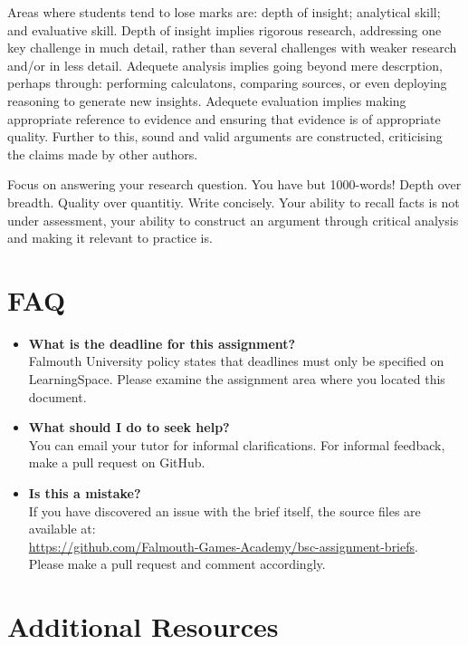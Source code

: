 \documentclass{../fal_assignment}
\begin{document}
Areas where students tend to lose marks are: depth of insight; analytical skill; and evaluative skill. Depth of insight implies rigorous research, addressing one key challenge in much detail, rather than several challenges with weaker research and/or in less detail. Adequete analysis implies going beyond mere descrption, perhaps through: performing calculatons, comparing sources, or even deploying reasoning to generate new insights. Adequete evaluation implies making appropriate reference to evidence and ensuring that evidence is of appropriate quality. Further to this, sound and valid arguments are constructed, criticising the claims made by other authors.

Focus on answering your research question. You have but 1000-words! Depth over breadth. Quality over quantitiy. Write concisely. Your ability to recall facts is not under assessment, your ability to construct an argument through critical analysis and making it relevant to practice is.

\section*{FAQ}

\begin{itemize}
	\item 	\textbf{What is the deadline for this assignment?} \\ 
    		Falmouth University policy states that deadlines must only be specified on LearningSpace. Please examine the assignment area where you located this document.
    		
	\item 	\textbf{What should I do to seek help?} \\ 
    		You can email your tutor for informal clarifications. For informal feedback, make a pull request on GitHub. 
    		
    	\item 	\textbf{Is this a mistake?} \\ 	
    		If you have discovered an issue with the brief itself, the source files are available at: \\
    		\url{https://github.com/Falmouth-Games-Academy/bsc-assignment-briefs}.\\
    		 Please make a pull request and comment accordingly.
\end{itemize}

\section*{Additional Resources}
\end{document}
